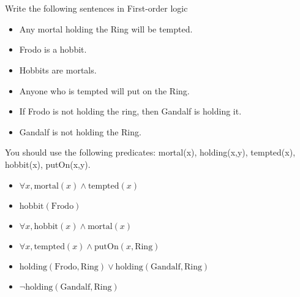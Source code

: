 \documentclass[paper=a4, fontsize=11pt]{scrartcl} %
\begin{document}
\maketitle %

\section{}

\begin{fancyquotes}
  Write the following sentences in First-order logic

  \begin{itemize}
    \item Any mortal holding the Ring will be tempted.
    \item Frodo is a hobbit.
    \item Hobbits are mortals.
    \item Anyone who is tempted will put on the Ring.
    \item If Frodo is not holding the ring, then Gandalf is holding it.
    \item Gandalf is not holding the Ring.
  \end{itemize}

  You should use the following predicates: mortal(x), holding(x,y),
  tempted(x), hobbit(x), putOn(x,y).
\end{fancyquotes}

\begin{itemize}
\item $\forall x, \text{mortal}(x) \land \text{tempted}(x)$
\item $\text{hobbit}(\text{Frodo})$
\item $\forall x, \text{hobbit}(x) \land \text{mortal}(x)$
\item $\forall x, \text{tempted}(x) \land \text{putOn}(x,\text{Ring})$
\item $\text{holding}(\text{Frodo}, \text{Ring}) \lor
  \text{holding}(\text{Gandalf}, \text{Ring})$
\item $\lnot \text{holding}(\text{Gandalf}, \text{Ring})$
\end{itemize}

\pagebreak

\end{document}
